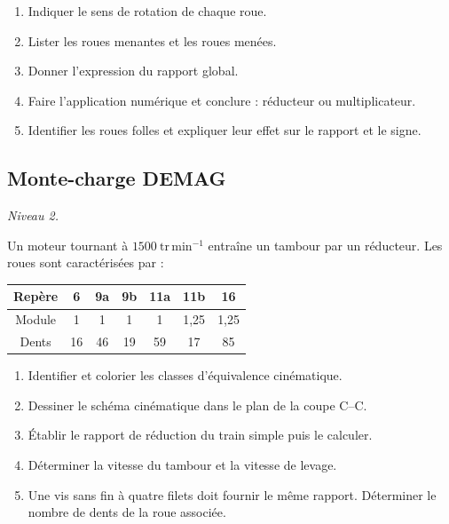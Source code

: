 
\begin{enumerate}
  \item Indiquer le sens de rotation de chaque roue.
  \item Lister les roues menantes et les roues menées.
  \item Donner l'expression du rapport global.
  \item Faire l'application numérique et conclure : réducteur ou multiplicateur.
  \item Identifier les roues folles et expliquer leur effet sur le rapport et le signe.
\end{enumerate}

\subsection{Monte-charge DEMAG}

\textit{Niveau 2.}

Un moteur tournant à $1500\ \mathrm{tr\,min^{-1}}$ entraîne un tambour
par un réducteur. Les roues sont caractérisées par :

\begin{center}
\small
\begin{tabular}{c|cccccc}
Repère & 6 & 9a & 9b & 11a & 11b & 16\\ \hline
Module & 1 & 1 & 1 & 1 & 1,25 & 1,25\\
Dents & 16 & 46 & 19 & 59 & 17 & 85
\end{tabular}
\end{center}

\begin{center}
\hfill
{}
\end{center}

\begin{enumerate}
  \item Identifier et colorier les classes d'équivalence cinématique.
  \item Dessiner le schéma cinématique dans le plan de la coupe C--C.
  \item Établir le rapport de réduction du train simple puis le calculer.
  \item Déterminer la vitesse du tambour et la vitesse de levage.
  \item Une vis sans fin à quatre filets doit fournir le même rapport. Déterminer le nombre de dents de la roue associée.
\end{enumerate}

